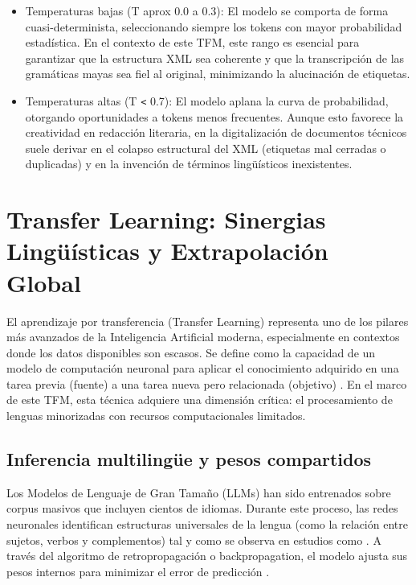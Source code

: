 \begin{itemize}
    \item Temperaturas bajas (T aprox 0.0 a 0.3): El modelo se comporta de forma cuasi-determinista, seleccionando siempre los tokens con mayor probabilidad estadística. En el contexto de este TFM, este rango es esencial para garantizar que la estructura XML sea coherente y que la transcripción de las gramáticas mayas sea fiel al original, minimizando la alucinación de etiquetas.
    \item Temperaturas altas (T \texttt{\textless} 0.7): El modelo aplana la curva de probabilidad, otorgando oportunidades a tokens menos frecuentes. Aunque esto favorece la creatividad en redacción literaria, en la digitalización de documentos técnicos suele derivar en el colapso estructural del XML (etiquetas mal cerradas o duplicadas) y en la invención de términos lingüísticos inexistentes.
\end{itemize}


\section{ Transfer Learning: Sinergias Lingüísticas y Extrapolación Global }
El aprendizaje por transferencia (Transfer Learning) representa uno de los pilares más avanzados de la Inteligencia Artificial moderna, especialmente en contextos donde los datos disponibles son escasos. Se define como la capacidad de un modelo de computación neuronal para aplicar el conocimiento adquirido en una tarea previa (fuente) a una tarea nueva pero relacionada (objetivo) \parencite{pires-etal-2019-multilingual}. En el marco de este TFM, esta técnica adquiere una dimensión crítica: el procesamiento de lenguas minorizadas con recursos computacionales limitados.

\subsection{ Inferencia multilingüe y pesos compartidos }
Los Modelos de Lenguaje de Gran Tamaño (LLMs) han sido entrenados sobre corpus masivos que incluyen cientos de idiomas. Durante este proceso, las redes neuronales identifican estructuras universales de la lengua (como la relación entre sujetos, verbos y complementos) tal y como se observa en estudios como \cite{Kann2020Acquisition}. A través del algoritmo de retropropagación o backpropagation, el modelo ajusta sus pesos internos para minimizar el error de predicción
\textcite{conneau-etal-2020-unsupervised}.


